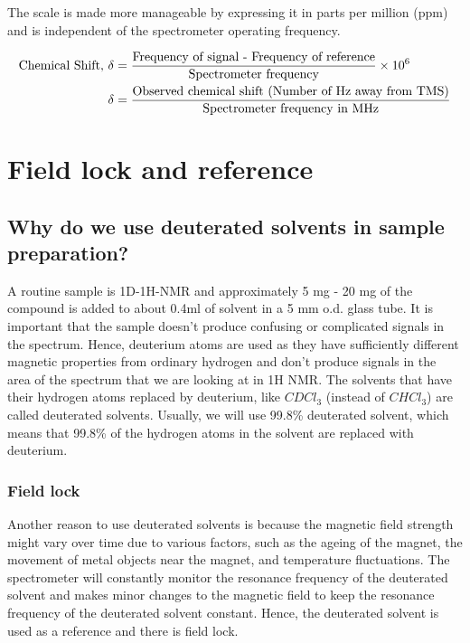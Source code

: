 \documentclass[11pt]{article}
\begin{document}
The scale is made more manageable by expressing it in parts per million (ppm) and is independent of the spectrometer operating frequency.

\begin{align*}
\text{Chemical Shift, } \delta &= \frac{\text{Frequency of signal - Frequency of reference}}{\text{Spectrometer frequency}} \times 10^6 \\
\delta &= \frac{\text{Observed chemical shift (Number of \si{\hertz} away from TMS)}}{\text{Spectrometer frequency in \si{\mega\hertz}}}
\end{align*}

\section{Field lock and reference}
\label{sec:org40c88ea}

\subsection{Why do we use deuterated solvents in sample preparation?}
\label{sec:orgaded52a}
A routine sample is 1D-1H-NMR and approximately 5 mg - 20 mg of the compound is added to about 0.4ml of solvent in a 5 mm o.d. glass tube. It is important that the sample doesn't produce confusing or complicated signals in the spectrum. Hence, deuterium atoms are used as they have sufficiently different magnetic properties from ordinary hydrogen and don't produce signals in the area of the spectrum that we are looking at in 1H NMR. The solvents that have their hydrogen atoms replaced by deuterium, like \(CDCl_3\) (instead of \(CHCl_3\)) are called deuterated solvents. Usually, we will use 99.8\% deuterated solvent, which means that 99.8\% of the hydrogen atoms in the solvent are replaced with deuterium.

\newpage

\subsubsection{Field lock}
\label{sec:org9ae8083}
Another reason to use deuterated solvents is because the magnetic field strength might vary over time due to various factors, such as the ageing of the magnet, the movement of metal objects near the magnet, and temperature fluctuations. The spectrometer will constantly monitor the resonance frequency of the deuterated solvent and makes minor changes to the magnetic field to keep the resonance frequency of the deuterated solvent constant. Hence, the deuterated solvent is used as a reference and there is field lock.
\\[0pt]
\end{document}

